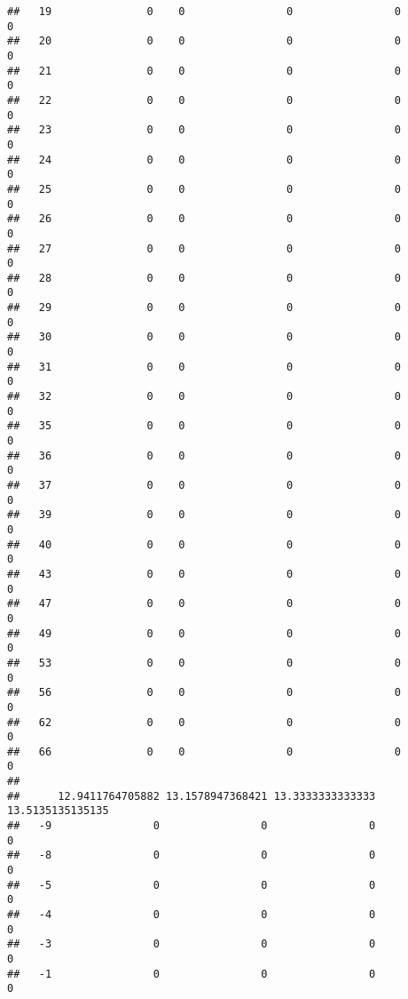 \documentclass[]{article}
\begin{document}
\begin{verbatim}
##   19               0    0                0                0                0
##   20               0    0                0                0                0
##   21               0    0                0                0                0
##   22               0    0                0                0                0
##   23               0    0                0                0                0
##   24               0    0                0                0                0
##   25               0    0                0                0                0
##   26               0    0                0                0                0
##   27               0    0                0                0                0
##   28               0    0                0                0                0
##   29               0    0                0                0                0
##   30               0    0                0                0                0
##   31               0    0                0                0                0
##   32               0    0                0                0                0
##   35               0    0                0                0                0
##   36               0    0                0                0                0
##   37               0    0                0                0                0
##   39               0    0                0                0                0
##   40               0    0                0                0                0
##   43               0    0                0                0                0
##   47               0    0                0                0                0
##   49               0    0                0                0                0
##   53               0    0                0                0                0
##   56               0    0                0                0                0
##   62               0    0                0                0                0
##   66               0    0                0                0                0
##     
##      12.9411764705882 13.1578947368421 13.3333333333333 13.5135135135135
##   -9                0                0                0                0
##   -8                0                0                0                0
##   -5                0                0                0                0
##   -4                0                0                0                0
##   -3                0                0                0                0
##   -1                0                0                0                0

\end{verbatim}
\end{document}

